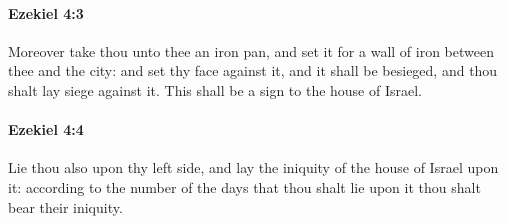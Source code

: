 		\paragraph{Ezekiel 4:3} %
			\label{EZEKIEL-4-3}

			Moreover take thou unto thee an iron pan, and set it for a wall of iron between thee and the city: and set thy face against it, and it shall be besieged, and thou shalt lay siege against it. This shall be a sign to the house of Israel.


		\paragraph{Ezekiel 4:4} %
			\label{EZEKIEL-4-4}

			Lie thou also upon thy left side, and lay the iniquity of the house of Israel upon it: according to the number of the days that thou shalt lie upon it thou shalt bear their iniquity.

